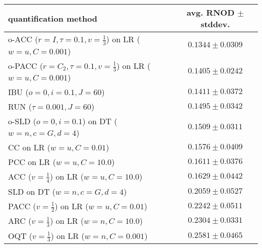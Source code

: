 \begin{tabular}{lc}
  \toprule
  quantification method & avg. RNOD $\pm$ stddev. \\
  \midrule
  o-ACC ($r=I, \tau=0.1, v=\frac{1}{3}$) on LR ($w=u, C=0.001$) & $\mathbf{0.1344 \pm 0.0309}$ \\
  o-PACC ($r=C_2, \tau=0.1, v=\frac{1}{3}$) on LR ($w=u, C=0.001$) & $0.1405 \pm 0.0242$ \\
  IBU ($o=0, i=0.1, J=60$) & $0.1411 \pm 0.0372$ \\
  RUN ($\tau=0.001, J=60$) & $0.1495 \pm 0.0342$ \\
  o-SLD ($o=0, i=0.1$) on DT ($w=n, c=G, d=4$) & $0.1509 \pm 0.0311$ \\
  CC on LR ($w=u, C=0.01$) & $0.1576 \pm 0.0409$ \\
  PCC on LR ($w=u, C=10.0$) & $0.1611 \pm 0.0376$ \\
  ACC ($v=\frac{1}{4}$) on LR ($w=u, C=10.0$) & $0.1629 \pm 0.0442$ \\
  SLD on DT ($w=n, c=G, d=4$) & $0.2059 \pm 0.0527$ \\
  PACC ($v=\frac{1}{2}$) on LR ($w=u, C=0.01$) & $0.2242 \pm 0.0511$ \\
  ARC ($v=\frac{1}{3}$) on LR ($w=n, C=10.0$) & $0.2304 \pm 0.0331$ \\
  OQT ($v=\frac{1}{3}$) on LR ($w=n, C=0.001$) & $0.2581 \pm 0.0465$ \\
  \bottomrule
\end{tabular}
